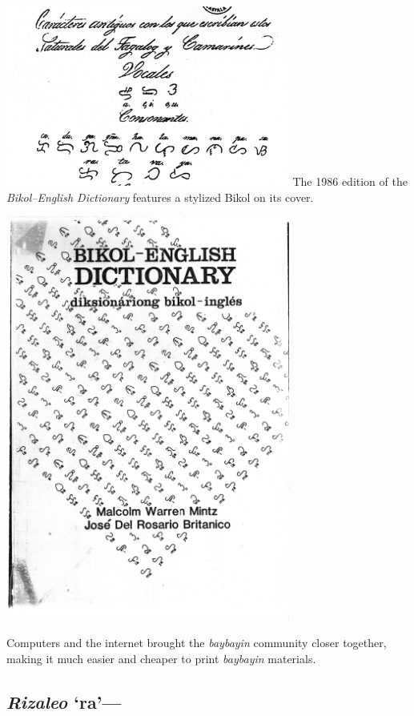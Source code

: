 \documentclass[a4paper,pagesize,openany,14pt,parskip=never]{scrbook}
\newcommand{\≈}{$\approx$}
\begin{document}
\includegraphics[width=0.7\textwidth]{oldbikol3}
\newpage
The 1986 edition of the {\em Bikol--English Dictionary} features a stylized Bikol {\baybayinb {}} on its cover.

\includegraphics[width=0.7\textwidth]{DCover}
\newpage


Computers and the internet brought the {\em baybayin} community closer together, making it much easier and cheaper to print {\em baybayin} materials. 

\subsection{{\em Rizaleo} `ra'---{\baybayinb {}}}
\end{document}
